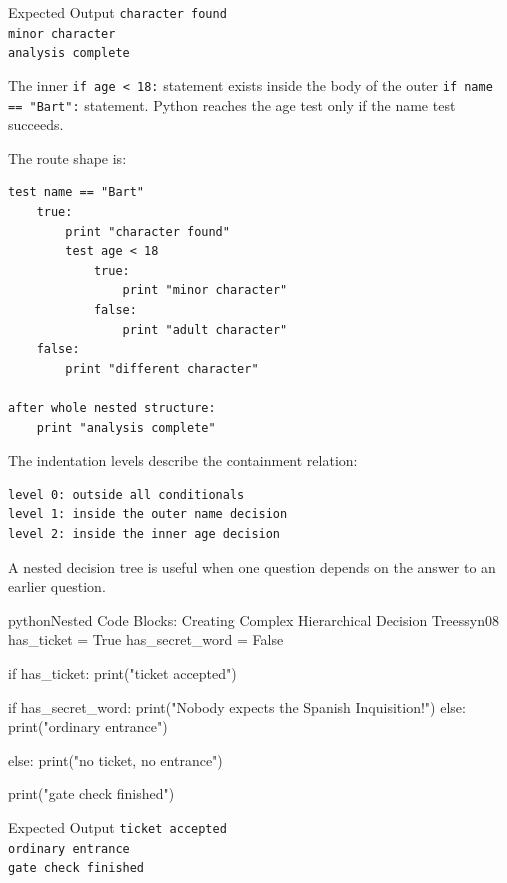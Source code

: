 \begin{iobox}{Expected Output}
\texttt{character found} \\
\texttt{minor character} \\
\texttt{analysis complete} \\
\end{iobox}


The inner \texttt{if age < 18:} statement exists inside the body of the outer \texttt{if name == "Bart":} statement. Python reaches the age test only if the name test succeeds.

The route shape is:

\begin{verbatim}
test name == "Bart"
    true:
        print "character found"
        test age < 18
            true:
                print "minor character"
            false:
                print "adult character"
    false:
        print "different character"

after whole nested structure:
    print "analysis complete"
\end{verbatim}

The indentation levels describe the containment relation:

\begin{verbatim}
level 0: outside all conditionals
level 1: inside the outer name decision
level 2: inside the inner age decision
\end{verbatim}

A nested decision tree is useful when one question depends on the answer to an earlier question.

\begin{codebox}[]{python}{Nested Code Blocks: Creating Complex Hierarchical Decision Trees}{syn08}
has_ticket = True
has_secret_word = False

if has_ticket:
    print("ticket accepted")

    if has_secret_word:
        print("Nobody expects the Spanish Inquisition!")
    else:
        print("ordinary entrance")

else:
    print("no ticket, no entrance")

print("gate check finished")
\end{codebox}


\begin{iobox}{Expected Output}
\texttt{ticket accepted} \\
\texttt{ordinary entrance} \\
\texttt{gate check finished} \\
\end{iobox}



